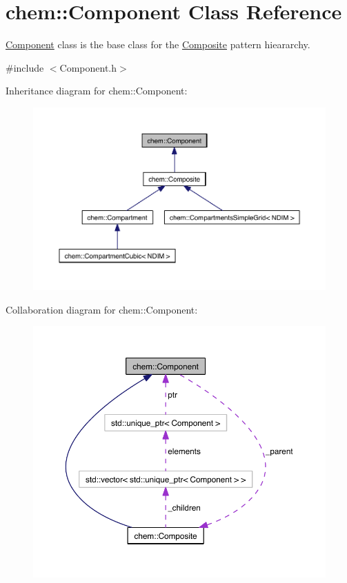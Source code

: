 \hypertarget{classchem_1_1Component}{\section{chem\-:\-:Component Class Reference}
\label{classchem_1_1Component}
}


\hyperlink{classchem_1_1Component}{Component} class is the base class for the \hyperlink{classchem_1_1Composite}{Composite} pattern hieararchy.  




{\ttfamily \#include $<$Component.\-h$>$}



Inheritance diagram for chem\-:\-:Component\-:\nopagebreak
\begin{figure}[H]
\begin{center}
\leavevmode
\includegraphics[width=350pt]{classchem_1_1Component__inherit__graph}
\end{center}
\end{figure}


Collaboration diagram for chem\-:\-:Component\-:\nopagebreak
\begin{figure}[H]
\begin{center}
\leavevmode
\includegraphics[width=350pt]{classchem_1_1Component__coll__graph}
\end{center}
\end{figure}
